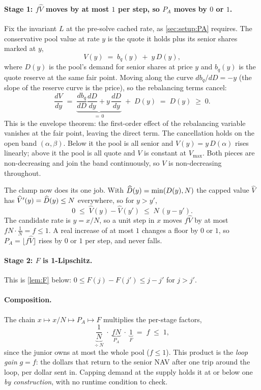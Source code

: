 \paragraph{Stage 1: $f\widehat{V}$ moves by at most $1$ per step, so $P_A$ moves by $0$ or $1$.}
Fix the invariant $L$ at the pre-solve cached rate, as
\cref{sec:setup:PA} requires. The conservative pool value at rate $y$ is
the quote it holds plus its senior shares marked at $y$,
\[
  V(y) \;=\; b_q(y) \;+\; y\,D(y),
\]
where $D(y)$ is the pool's demand for senior shares at price $y$ and
$b_q(y)$ is the quote reserve at the same fair point. Moving along the
curve $db_q/dD = -y$ (the slope of the reserve curve is the price), so
the rebalancing terms cancel:
\[
  \frac{dV}{dy}
    \;=\; \underbrace{\frac{db_q}{dD}\frac{dD}{dy} + y\,\frac{dD}{dy}}_{=\,0}
       \;+\; D(y)
    \;=\; D(y) \;\geq\; 0.
\]
This is the envelope theorem: the first-order effect of the rebalancing
variable vanishes at the fair point, leaving the direct term. The
cancellation holds on the open band $(\alpha, \beta)$. Below it the pool
is all senior and $V(y) = y\,D(\alpha)$ rises linearly; above it the
pool is all quote and $V$ is constant at $V_{\max}$. Both pieces are
non-decreasing and join the band continuously, so $V$ is non-decreasing
throughout.

The clamp now does its one job. With $\widehat{D}(y) = \min(D(y), N)$ the
capped value $\widehat{V}$ has $\widehat{V}'(y) = \widehat{D}(y) \leq N$
everywhere, so for $y > y'$,
\[
  0 \;\leq\; \widehat{V}(y) - \widehat{V}(y') \;\leq\; N\,(y - y').
\]
The candidate rate is $y = x/N$, so a unit step in $x$ moves
$f\widehat{V}$ by at most $f N \cdot \tfrac1N = f \leq 1$. A real
increase of at most $1$ changes a floor by $0$ or $1$, so
$P_A = \lfloor f \widehat{V}\rfloor$ rises by $0$ or $1$ per step, and
never falls.

\paragraph{Stage 2: $F$ is 1-Lipschitz.}
This is \cref{lem:F} below: $0 \leq F(j) - F(j') \leq j - j'$ for
$j > j'$.

\paragraph{Composition.}
The chain $x \mapsto x/N \mapsto P_A \mapsto F$ multiplies the per-stage
factors,
\[
  \underbrace{\frac{1}{N}}_{\div\, N}
  \;\cdot\;
  \underbrace{f N}_{P_A}
  \;\cdot\;
  \underbrace{1}_{F}
  \;=\; f \;\leq\; 1,
\]
since the junior owns at most the whole pool ($f \leq 1$). This product
is the \emph{loop gain} $g = f$: the dollars that return to the senior
NAV after one trip around the loop, per dollar sent in. Capping demand
at the supply holds it at or below one \emph{by construction}, with no
runtime condition to check.


